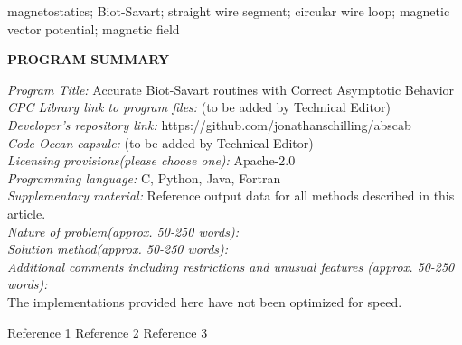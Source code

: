 \documentclass[preprint,12pt]{elsarticle}
\begin{document}
\begin{frontmatter}
\begin{keyword}
magnetostatics; Biot-Savart; straight wire segment; circular wire loop; magnetic vector potential; magnetic field
\end{keyword}

\end{frontmatter}



{\bf PROGRAM SUMMARY}

\begin{small}
\noindent
{\em Program Title:} Accurate Biot-Savart routines with Correct Asymptotic Behavior \\
{\em CPC Library link to program files:} (to be added by Technical Editor) \\
{\em Developer's repository link:} https://github.com/jonathanschilling/abscab \\
{\em Code Ocean capsule:} (to be added by Technical Editor)\\
{\em Licensing provisions(please choose one):} Apache-2.0 \\
{\em Programming language:} C, Python, Java, Fortran \\
{\em Supplementary material:} Reference output data for all methods described in this article. \\
{\em Nature of problem(approx. 50-250 words):}\\
{\em Solution method(approx. 50-250 words):}\\
{\em Additional comments including restrictions and unusual features (approx. 50-250 words):}\\
The implementations provided here have not been optimized for speed.
   \\

\begin{thebibliography}{0}
Reference 1         %
Reference 2         %
Reference 3         %
\end{thebibliography}
\end{small}
\end{document}

